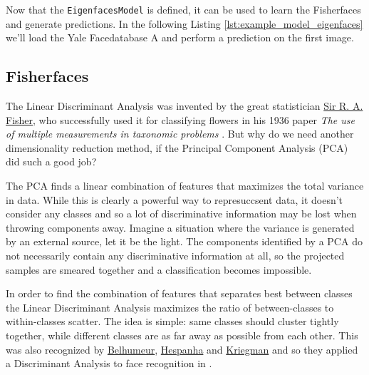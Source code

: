 		Now that the \lstinline|EigenfacesModel| is defined, it can be used to learn the Fisherfaces and generate predictions. In the following Listing \ref{lst:example_model_eigenfaces} we'll load the Yale Facedatabase A and perform a prediction on the first image.
		
	

\fi

\subsection{Fisherfaces}

\label{ssection:fisherfaces}

The Linear Discriminant Analysis was invented by the great statistician \href{http://en.wikipedia.org/wiki/Ronald_Fisher}{Sir R. A. Fisher}, who successfully used it for classifying flowers in his 1936 paper \textit{The use of multiple measurements in taxonomic problems} \cite{Fisher36}. But why do we need another dimensionality reduction method, if the Principal Component Analysis (PCA) did such a good job? 

The PCA finds a linear combination of features that maximizes the total variance in data. While this is clearly a powerful way to represuccsent data, it doesn't consider any classes and so a lot of discriminative information may be lost when throwing components away. Imagine a situation where the variance is generated by an external source, let it be the light. The components identified by a PCA do not necessarily contain any discriminative information at all, so the projected samples are smeared together and a classification becomes impossible.

In order to find the combination of features that separates best between classes the Linear Discriminant Analysis maximizes the ratio of between-classes to within-classes scatter. The idea is simple: same classes should cluster tightly together, while different classes are as far away as possible from each other. This was also recognized by \href{http://www.cs.columbia.edu/~belhumeur/}{Belhumeur}, \href{http://www.ece.ucsb.edu/~hespanha/}{Hespanha} and \href{http://cseweb.ucsd.edu/~kriegman/}{Kriegman} and so they applied a Discriminant Analysis to face recognition in \cite{belhumeru97}. 

